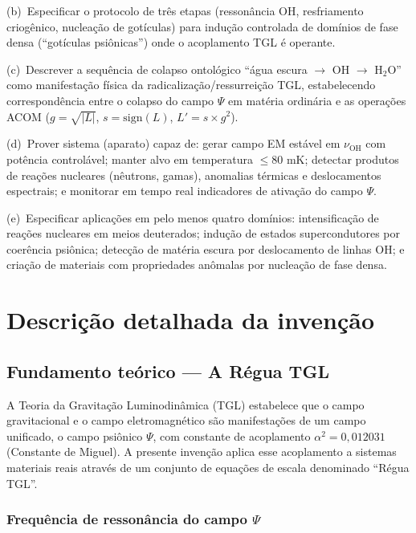 \documentclass[12pt,a4paper]{article}
\newcommand{\alphaii}{\alpha^2}
\newcommand{\nuOH}{\nu_{\text{OH}}}
\begin{document}
(b)~Especificar o protocolo de três etapas (ressonância OH,
resfriamento criogênico, nucleação de gotículas) para indução
controlada de domínios de fase densa (``gotículas psiônicas'')
onde o acoplamento TGL é operante.

(c)~Descrever a sequência de colapso ontológico ``água escura
$\to$ OH $\to$ H$_2$O'' como manifestação física da
radicalização/ressurreição TGL, estabelecendo correspondência
entre o colapso do campo $\Psi$ em matéria ordinária e as
operações ACOM ($g = \sqrt{|L|}$, $s = \text{sign}(L)$,
$L' = s \times g^2$).

(d)~Prover sistema (aparato) capaz de: gerar campo EM
estável em $\nuOH$ com potência controlável; manter alvo
em temperatura $\leq 80$ mK; detectar produtos de reações
nucleares (nêutrons, gamas), anomalias térmicas e
deslocamentos espectrais; e monitorar em tempo real
indicadores de ativação do campo $\Psi$.

(e)~Especificar aplicações em pelo menos quatro domínios:
intensificação de reações nucleares em meios deuterados;
indução de estados supercondutores por coerência psiônica;
detecção de matéria escura por deslocamento de linhas OH;
e criação de materiais com propriedades anômalas por
nucleação de fase densa.

\newpage
\section{Descrição detalhada da invenção}

\subsection{Fundamento teórico --- A Régua TGL}

A Teoria da Gravitação Luminodinâmica (TGL) estabelece que o
campo gravitacional e o campo eletromagnético são manifestações
de um campo unificado, o campo psiônico $\Psi$, com constante
de acoplamento $\alphaii = 0{,}012031$ (Constante de Miguel).
A presente invenção aplica esse acoplamento a sistemas materiais
reais através de um conjunto de equações de escala denominado
``Régua TGL''.

\subsubsection{Frequência de ressonância do campo $\Psi$}
\end{document}

